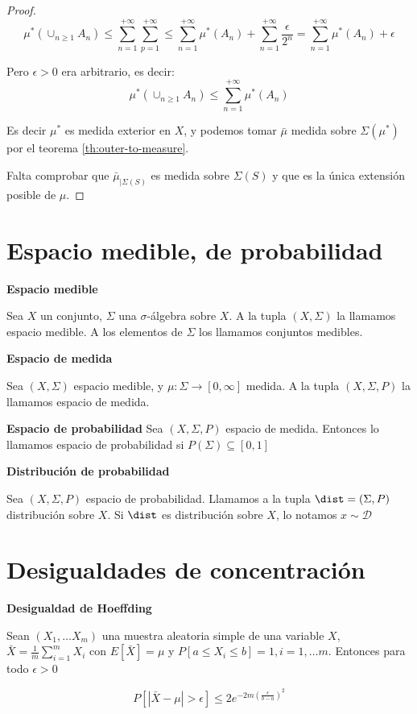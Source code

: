 \begin{proof}
 \[\mu^\ast(\cup_{n\ge 1} A_n) \le \sum_{n=1}^{+\infty} \sum_{p=1}^{+\infty} \le 
   \sum_{n=1}^{+\infty}\mu^\ast(A_n) + \sum_{n=1}^{+\infty}\frac{\epsilon}{2^n} = 
   \sum_{n=1}^{+\infty}\mu^\ast(A_n) + \epsilon\]
 
 Pero $\epsilon > 0$ era arbitrario, es decir: 
 \[\mu^\ast(\cup_{n\ge 1} A_n) \le \sum_{n=1}^{+\infty}\mu^\ast(A_n)\]
 
 Es decir $\mu^\ast$ es medida exterior en $X$, y podemos tomar $\bar{\mu}$ medida sobre $\Sigma(\mu^\ast)$ por
 el teorema \ref{th:outer-to-measure}.
 
 Falta comprobar que $\bar{\mu}_{|\Sigma(S)}$ es medida sobre $\Sigma(S)$ y que es la única extensión posible de $\mu$.
\end{proof}



\section{Espacio medible, de probabilidad}

\begin{definition} \textbf{Espacio medible}

 Sea $X$ un conjunto, $\Sigma$ una $\sigma$-álgebra sobre $X$. A la tupla $(X,\Sigma)$ la llamamos
 espacio medible. A los elementos de $\Sigma$ los llamamos conjuntos medibles.
\end{definition}


\begin{definition} \textbf{Espacio de medida}

 Sea $(X, \Sigma)$ espacio medible, y $\mu: \Sigma \rightarrow [0,\infty]$ medida. A la tupla $(X, \Sigma, P)$ 
 la llamamos espacio de medida.
\end{definition}


\begin{definition} \textbf{Espacio de probabilidad}
 Sea $(X, \Sigma, P)$ espacio de medida. Entonces lo llamamos espacio de probabilidad si $P(\Sigma)\subseteq [0,1]$
\end{definition}


\begin{definition} \textbf{Distribución de probabilidad}

 Sea $(X, \Sigma, P)$ espacio de probabilidad. Llamamos a la tupla $\dist = (\Sigma,P)$ distribución sobre $X$. 
 Si $\dist$ es distribución sobre $X$, lo notamos $x\sim \mathcal{D}$
\end{definition}


\section{Desigualdades de concentración}
\begin{lemma} \textbf{Desigualdad de Hoeffding}

 Sean $(X_1, \ldots X_m)$ una muestra aleatoria simple de una variable $X$, 
 $\bar{X} = \frac{1}{m} \sum_{i=1}^m X_i$ con $E[\bar{X}] = \mu$ y $P[a \le X_i \le b] = 1, i=1, \ldots m$. 
 Entonces para todo $\epsilon > 0$

 \[P\left[\left| \bar{X} - \mu \right| > \epsilon \right] \le 2e^{-2m \left(\frac{\epsilon}{b-a}\right)^2}\]
\end{lemma}